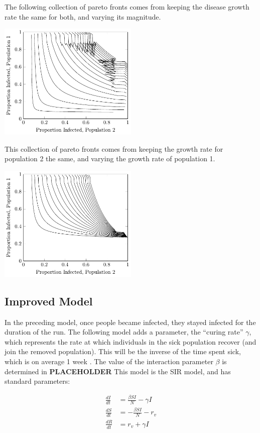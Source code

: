 \documentclass[titlepage]{article}
\begin{document}
The following collection of pareto fronts comes from keeping the disease
	growth rate the same for both, and varying its magnitude.

\includegraphics[width=0.5\textwidth]{figures/vaccination-model-same-r-pareto-curves.pdf}

This collection of pareto fronts comes from keeping the growth
	rate for population 2 the same, and varying the growth
	rate of population 1.

\includegraphics[width=0.5\textwidth]{figures/vaccination-model-different-r-pareto-curves.pdf}

\subsection{Improved Model}

In the preceding model, once people became infected, they stayed
	infected for the duration of the run.
The following model adds a parameter, the ``curing rate'' $\gamma$,
	which represents the rate at which individuals in the sick population
	recover (and join the removed population).
This will be the inverse of the time spent sick, which is on average
	1 week \cite{CIC-stats}.
The value of the interaction parameter $\beta$ is determined in \textbf{PLACEHOLDER}
This model is the SIR model, and has standard parameters:

\begin{align*}
\frac{dI}{dt} & = \frac{ \beta S I}{N} - \gamma I\\
\frac{dS}{dt} & = -\frac{\beta S I}{N} - r_v \\
\frac{dR}{dt} & = r_v + \gamma I
\end{align*}
\end{document}
